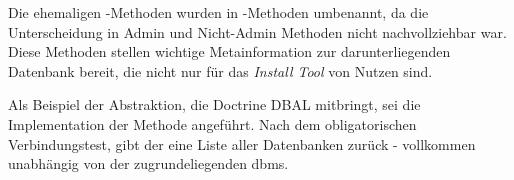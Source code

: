 
Die ehemaligen -Methoden wurden in -Methoden umbenannt, da die Unterscheidung in Admin und Nicht-Admin Methoden nicht nachvollziehbar war. Diese Methoden stellen wichtige Metainformation zur darunterliegenden Datenbank bereit, die nicht nur für das \textit{Install Tool} von Nutzen sind.

Als Beispiel der Abstraktion, die Doctrine DBAL mitbringt, sei die Implementation der Methode  angeführt. Nach dem obligatorischen Verbindungstest, gibt der  eine Liste aller Datenbanken zurück - vollkommen unabhängig von der zugrundeliegenden \gls{dbms}.


